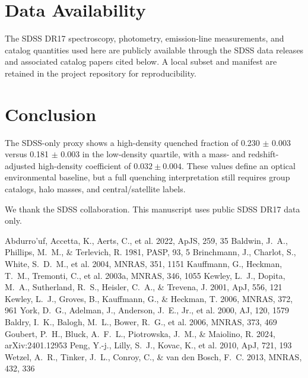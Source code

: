 \documentclass[twocolumn]{aastex631}
\begin{document}
\section{Data Availability}\label{sec:data-avail}
The SDSS DR17 spectroscopy, photometry, emission-line measurements, and catalog quantities used here are publicly available through the SDSS data releases and associated catalog papers cited below. A local subset and manifest are retained in the project repository for reproducibility.

\section{Conclusion}\label{sec:conclusion}
The SDSS-only proxy shows a high-density quenched fraction of 0.230 $\pm$ 0.003 versus 0.181 $\pm$ 0.003 in the low-density quartile, with a mass- and redshift-adjusted high-density coefficient of $0.032 \pm 0.004$. These values define an optical environmental baseline, but a full quenching interpretation still requires group catalogs, halo masses, and central/satellite labels.

\acknowledgments
We thank the SDSS collaboration. This manuscript uses public SDSS DR17 data only.


\begin{thebibliography}{}
 Abdurro'uf, Accetta, K., Aerts, C., et al. 2022, ApJS, 259, 35
 Baldwin, J.~A., Phillips, M.~M., \& Terlevich, R. 1981, PASP, 93, 5
 Brinchmann, J., Charlot, S., White, S.~D.~M., et al. 2004, MNRAS, 351, 1151
 Kauffmann, G., Heckman, T.~M., Tremonti, C., et al. 2003a, MNRAS, 346, 1055
 Kewley, L.~J., Dopita, M.~A., Sutherland, R.~S., Heisler, C.~A., \& Trevena, J. 2001, ApJ, 556, 121
 Kewley, L.~J., Groves, B., Kauffmann, G., \& Heckman, T. 2006, MNRAS, 372, 961
 York, D.~G., Adelman, J., Anderson, J.~E., Jr., et al. 2000, AJ, 120, 1579
 Baldry, I.~K., Balogh, M.~L., Bower, R.~G., et al. 2006, MNRAS, 373, 469
 Goubert, P.~H., Bluck, A.~F.~L., Piotrowska, J.~M., \& Maiolino, R. 2024, arXiv:2401.12953
 Peng, Y.-j., Lilly, S.~J., Kovac, K., et al. 2010, ApJ, 721, 193
 Wetzel, A.~R., Tinker, J.~L., Conroy, C., \& van den Bosch, F.~C. 2013, MNRAS, 432, 336
\end{thebibliography}
\end{document}
